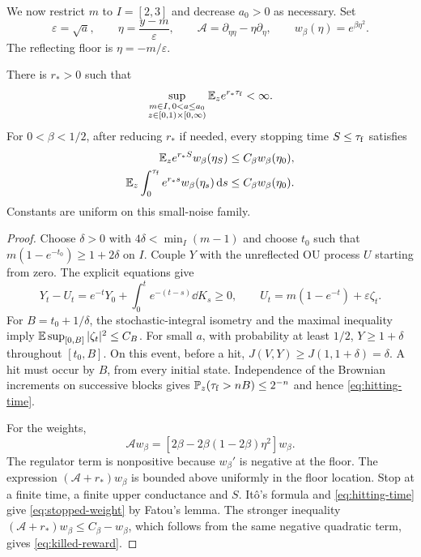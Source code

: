 We now restrict $m$ to $I=[2,3]$ and decrease $a_0>0$ as necessary.
Set
\[
 \varepsilon=\sqrt a,\qquad \eta=\frac{y-m}{\varepsilon},\qquad
 \mathcal A=\partial_{\eta\eta}-\eta\partial_\eta,\qquad
 w_\beta(\eta)=e^{\beta\eta^2}.
\]
The reflecting floor is $\eta=-m/\varepsilon$.

\begin{lemma}\label{lem:hitting}
There is $r_*>0$ such that
\begin{equation}\label{eq:hitting-time}
 \sup_{\substack{m\in I,\,0<a\le a_0\\z\in[0,1)\times[0,\infty)}}
                         \mathbb E_z e^{r_*{\tau_{\mathrm f}}}<\infty.
\end{equation}
For $0<\beta<1/2$, after reducing $r_*$ if needed, every stopping time
$S\le{\tau_{\mathrm f}}$ satisfies
\begin{align}
 \mathbb E_z e^{r_*S}w_\beta(\eta_S)&\le C_\beta w_\beta(\eta_0),
                                                   \label{eq:stopped-weight}\\
 \mathbb E_z\int_0^{\tau_{\mathrm f}} e^{r_*s}w_\beta(\eta_s)\,\mathrm d s
       &\le C_\beta w_\beta(\eta_0).                 \label{eq:killed-reward}
\end{align}
Constants are uniform on this small-noise family.
\end{lemma}

\begin{proof}
Choose $\delta>0$ with $4\delta<\min_I(m-1)$ and choose $t_0$ such that
$m(1-e^{-t_0})\ge1+2\delta$ on $I$. Couple $Y$ with the unreflected OU
process $U$ starting from zero. The explicit equations give
\[
 Y_t-U_t=e^{-t}Y_0+\int_0^t e^{-(t-s)}\dd K_s\ge0,\qquad
 U_t=m(1-e^{-t})+\varepsilon \zeta_t.
\]
For $B=t_0+1/\delta$, the stochastic-integral isometry and the maximal
inequality imply $\mathbb E\sup_{[0,B]}|\zeta_t|^2\le C_B$. For small $a$,
with probability at least $1/2$, $Y\ge1+\delta$ throughout $[t_0,B]$.
On this event, before a hit, $J(V,Y)\ge J(1,1+\delta)=\delta$.
A hit must occur by $B$, from every initial state. Independence of the
Brownian increments on successive blocks gives
$\mathbb P_z({\tau_{\mathrm f}}>nB)\le2^{-n}$ and hence \eqref{eq:hitting-time}.

For the weights,
\begin{equation}\label{eq:OU-weight}
 \mathcal A w_\beta
   =[2\beta-2\beta(1-2\beta)\eta^2]w_\beta.
\end{equation}
The regulator term is nonpositive because $w_\beta'$ is negative at the
floor. The expression $(\mathcal A+r_*)w_\beta$ is bounded above
uniformly in the floor location. Stop at a finite time, a finite upper
conductance and $S$. It\^o's formula and \eqref{eq:hitting-time} give
\eqref{eq:stopped-weight} by Fatou's lemma. The stronger inequality
$(\mathcal A+r_*)w_\beta\le C_\beta-w_\beta$, which follows from the
same negative quadratic term, gives \eqref{eq:killed-reward}.
\end{proof}

